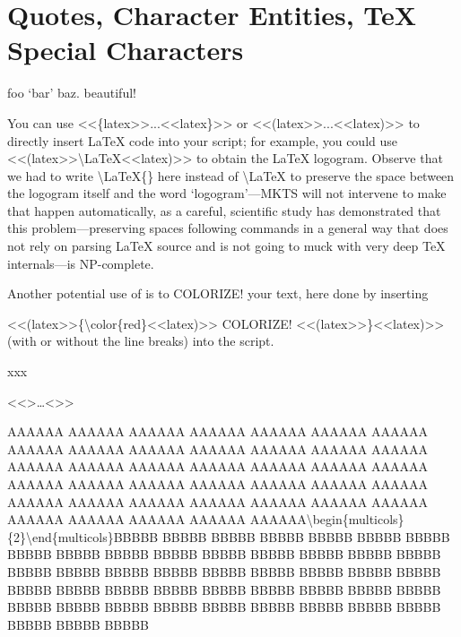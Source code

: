 \section{Quotes, Character Entities, TeX Special Characters
}
foo ‘bar’ baz.  beautiful!\mktsShowpar\par
\begin{multicols}{2}
You can use {\mktsStyleCode{}<<\{latex>>...<<latex\}>>} or {\mktsStyleCode{}<<(latex>>...<<latex)>>} to directly insert LaTeX
code into your script; for example, you could
use {\mktsStyleCode{}<<(latex>>\textbackslash{}LaTeX<<latex)>>}
to obtain the \LaTeX{} logogram.
Observe that we had to write {\mktsStyleCode{}\textbackslash{}LaTeX\{\}} here instead of {\mktsStyleCode{}\textbackslash{}LaTeX} to preserve the space between the logogram itself and
the word ‘logogram’—MKTS will not intervene to make that happen
automatically, as a careful, scientific study has demonstrated
that this problem—preserving spaces following commands in a
general way that does not rely on parsing \LaTeX{}
source and is not going to muck with very deep
\TeX{}
internals—is NP-complete.\mktsShowpar\par
Another potential use of  is to {\color{red}COLORIZE!} your text, here done by inserting\mktsShowpar\par
\begingroup\obeyalllines\mktsStyleCode{}<<(latex>>\{\textbackslash{}color\{red\}<<latex)>>
COLORIZE!
<<(latex>>\}<<latex)>>
\endgroup{}(with or without the line breaks) into the script.
\end{multicols}xxx\mktsShowpar\par
<<>…<>>\mktsShowpar\par
{}
AAAAAA AAAAAA AAAAAA AAAAAA AAAAAA AAAAAA AAAAAA AAAAAA AAAAAA AAAAAA AAAAAA AAAAAA
AAAAAA AAAAAA AAAAAA AAAAAA AAAAAA AAAAAA AAAAAA AAAAAA AAAAAA AAAAAA AAAAAA AAAAAA
AAAAAA AAAAAA AAAAAA AAAAAA AAAAAA AAAAAA AAAAAA AAAAAA AAAAAA AAAAAA AAAAAA AAAAAA
AAAAAA AAAAAA AAAAAA AAAAAA\textbackslash{}begin\{multicols\}\{2\}\textbackslash{}end\{multicols\}BBBBB BBBBB BBBBB BBBBB
BBBBB BBBBB BBBBB BBBBB BBBBB BBBBB BBBBB BBBBB BBBBB BBBBB BBBBB BBBBB BBBBB BBBBB BBBBB BBBBB BBBBB BBBBB BBBBB BBBBB BBBBB
BBBBB BBBBB BBBBB BBBBB BBBBB BBBBB BBBBB BBBBB BBBBB BBBBB BBBBB BBBBB BBBBB BBBBB BBBBB BBBBB BBBBB BBBBB BBBBB BBBBB BBBBB
